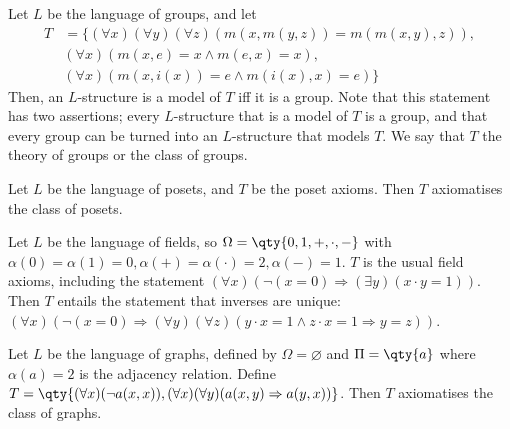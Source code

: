 \begin{example}
    Let $L$ be the language of groups, and let
    \begin{align*}
        T &= \{(\forall x)(\forall y)(\forall z)(m(x,m(y,z)) = m(m(x,y), z)), \\
        &(\forall x)(m(x,e) = x \wedge m(e,x) = x), \\
        &(\forall x)(m(x,i(x)) = e \wedge m(i(x),x) = e)\}
    \end{align*}
    Then, an $L$-structure is a model of $T$ iff it is a group.
    Note that this statement has two assertions; every $L$-structure that is a model of $T$ is a group, and that every group can be turned into an $L$-structure that models $T$.
    We say that $T$  the theory of groups or the class of groups.
\end{example}
\begin{example}
    Let $L$ be the language of posets, and $T$ be the poset axioms.
    Then $T$ axiomatises the class of posets.
\end{example}
\begin{example}
    Let $L$ be the language of fields, so $\Omega = \qty{0, 1, +, \cdot, -}$ with $\alpha(0) = \alpha(1) = 0, \alpha(+) = \alpha(\cdot) = 2, \alpha(-) = 1$.
    $T$ is the usual field axioms, including the statement $(\forall x)(\neg (x = 0) \Rightarrow (\exists y)(x \cdot y = 1))$.
    Then $T$ entails the statement that inverses are unique: $(\forall x)(\neg (x = 0) \Rightarrow (\forall y)(\forall z) (y \cdot x = 1 \wedge z \cdot x = 1 \Rightarrow y = z))$.
\end{example}
\begin{example}
    Let $L$ be the language of graphs, defined by $\Omega = \varnothing$ and $\Pi = \qty{a}$ where $\alpha(a) = 2$ is the adjacency relation.
    Define $T = \qty{(\forall x)(\neg a(x,x)), (\forall x)(\forall y)(a(x,y) \Rightarrow a(y,x))}$.
    Then $T$ axiomatises the class of graphs.
\end{example}


